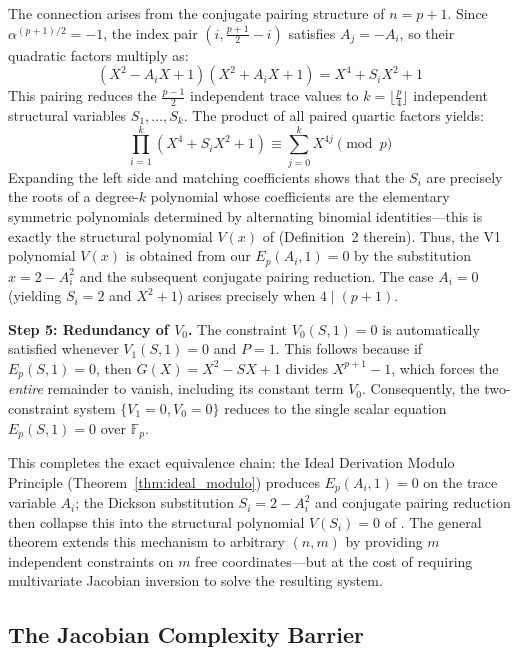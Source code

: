 \documentclass[12pt]{article}
\theoremstyle{plain}
\begin{document}
The connection arises from the conjugate pairing structure of $n=p+1$. Since $\alpha^{(p+1)/2} = -1$, the index pair $(i, \frac{p+1}{2}-i)$ satisfies $A_j = -A_i$, so their quadratic factors multiply as:
\begin{equation}
    (X^2 - A_i X + 1)(X^2 + A_i X + 1) = X^4 + S_i X^2 + 1
\end{equation}
This pairing reduces the $\frac{p-1}{2}$ independent trace values to $k = \lfloor \frac{p}{4} \rfloor$ independent structural variables $S_1, \dots, S_k$. The product of all paired quartic factors yields:
\begin{equation}
    \prod_{i=1}^{k} (X^4 + S_i X^2 + 1) \equiv \sum_{j=0}^{k} X^{4j} \pmod{p}
\end{equation}
Expanding the left side and matching coefficients shows that the $S_i$ are precisely the roots of a degree-$k$ polynomial whose coefficients are the elementary symmetric polynomials determined by alternating binomial identities---this is exactly the structural polynomial $V(x)$ of \cite{Wang2026ISIT} (Definition~2 therein). Thus, the V1 polynomial $V(x)$ is obtained from our $E_p(A_i, 1) = 0$ by the substitution $x = 2 - A_i^2$ and the subsequent conjugate pairing reduction. The case $A_i = 0$ (yielding $S_i = 2$ and $X^2 + 1$) arises precisely when $4 \mid (p+1)$.

\textbf{Step 5: Redundancy of $V_0$.} The constraint $V_0(S, 1) = 0$ is automatically satisfied whenever $V_1(S, 1) = 0$ and $P = 1$. This follows because if $E_{p}(S, 1) = 0$, then $G(X) = X^2 - SX + 1$ divides $X^{p+1} - 1$, which forces the \emph{entire} remainder to vanish, including its constant term $V_0$. Consequently, the two-constraint system $\{V_1 = 0, V_0 = 0\}$ reduces to the single scalar equation $E_p(S, 1) = 0$ over $\mathbb{F}_p$.

This completes the exact equivalence chain: the Ideal Derivation Modulo Principle (Theorem~\ref{thm:ideal_modulo}) produces $E_p(A_i, 1) = 0$ on the trace variable $A_i$; the Dickson substitution $S_i = 2 - A_i^2$ and conjugate pairing reduction then collapse this into the structural polynomial $V(S_i) = 0$ of \cite{Wang2026ISIT}. The general theorem extends this mechanism to arbitrary $(n, m)$ by providing $m$ independent constraints on $m$ free coordinates---but at the cost of requiring multivariate Jacobian inversion to solve the resulting system.

\subsection{The Jacobian Complexity Barrier}
\end{document}
